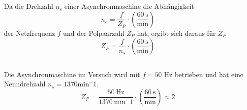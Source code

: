 \chapter{}\label{ex:aufg4}
%
\section{}\label{sec:aufg4a}
Da die Drehzahl $n_s$ einer Asynchronmaschine die Abhängigkeit
\begin{equation}
	n_s = \frac{f}{Z_P}\cdot \left(\frac{60~\mathrm{s}}{\mathrm{min}}\right)
\end{equation}
der Netzfrequenz $f$ und der Polpaarzahl $Z_P$  hat, ergibt sich daraus für $Z_P$
\begin{equation}
	Z_P = \frac{f}{n_s}\cdot \left(\frac{60~\mathrm{s}}{\mathrm{min}}\right)
\end{equation}
%

\section{}\label{sec:aufg4b}
Die Asynchronmaschine im Versuch wird mit $f = 50$ Hz betrieben und hat eine Nenndrehzahl $n_s = 1370 \mathrm{min}^-1$.
\begin{equation}
	Z_P = \frac{50~\mathrm{Hz}}{1370~\mathrm{min}^-1} \cdot \left(\frac{60~\mathrm{s}}{\mathrm{min}}\right) \approx 2
\end{equation}